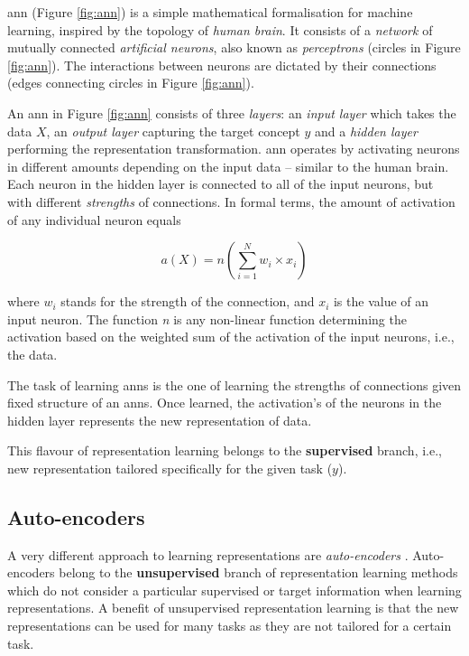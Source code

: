 \gls{ann} (Figure \ref{fig:ann}) is a simple mathematical formalisation for machine learning, inspired by the topology of  \textit{human brain}.
It consists of a \textit{network} of mutually connected \textit{artificial neurons}, also known as \textit{perceptrons} (circles in Figure \ref{fig:ann}).
The interactions between neurons are dictated by their connections (edges connecting circles in Figure \ref{fig:ann}).




An \gls{ann} in Figure \ref{fig:ann} consists of three \textit{layers}: an \textit{input layer} which takes the data $X$, an \textit{output layer} capturing the target concept $y$ and a \textit{hidden layer} performing the representation transformation.
\gls{ann} operates by activating neurons in different amounts depending on the input data -- similar to the human brain.
Each neuron in the hidden layer is connected to all of the input neurons, but with different \textit{strengths} of connections.
In formal terms, the amount of activation of any individual neuron equals

\begin{equation}
	a(X) = n(\sum_{i=1}^N w_i \times x_i)
\end{equation}

where $w_i$ stands for the strength of the connection, and $x_i$ is the value of an input neuron.
The function \textit{n} is any non-linear function determining the activation based on the weighted sum of the activation of the input neurons, i.e., the data.




The task of learning \gls{ann}s is the one of learning the strengths of connections given fixed structure of an \gls{ann}s.
Once learned, the activation's of the neurons in the hidden layer represents the new representation of data.


This flavour of representation learning belongs to the \textbf{supervised} branch, i.e.,  new representation tailored specifically for the given task ($y$).




\subsection{Auto-encoders}


A very different approach to learning representations are \textit{auto-encoders} \cite{Hinton504}.
Auto-encoders belong to the \textbf{unsupervised} branch of representation learning methods which do not consider a particular supervised or target information when learning representations.
A benefit of unsupervised representation learning is that the new representations can be used for many tasks as they are not tailored for a certain task.


